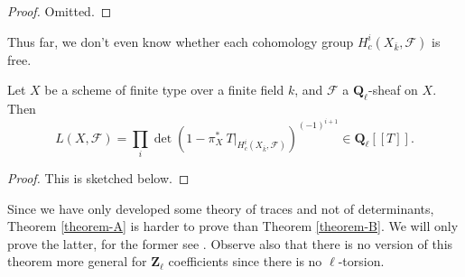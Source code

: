 \begin{proof}
Omitted.
\end{proof}

\noindent
Thus far, we don't even know whether each cohomology group
$H^i_c(X_{\bar k}, \mathcal{F})$ is free.

\begin{theorem}
\label{theorem-B}
Let $X$ be a scheme of finite type over a finite field $k$, and $\mathcal{F}$ a
$\mathbf{Q}_\ell$-sheaf on $X$. Then
$$
L(X, \mathcal{F}) = \prod_i \det\left(1-\pi_X^*\
T\Big|_{H_c^i\left(X_{\bar k} , \mathcal{F}\right)}\right)^{(-1)^{i+1}}
\in \mathbf{Q}_\ell[[ T]].
$$
\end{theorem}

\begin{proof}
This is sketched below.
\end{proof}

\begin{remark}
\label{remark-which-is-harder}
Since we have only developed some theory of traces and not of determinants,
Theorem \ref{theorem-A}
is harder to prove than
Theorem \ref{theorem-B}.
We will only prove the latter, for the former see \cite{SGA4.5}.
Observe also that there is no version of this theorem more general for
$\mathbf{Z}_\ell$ coefficients since there is no $\ell$-torsion.
\end{remark}

